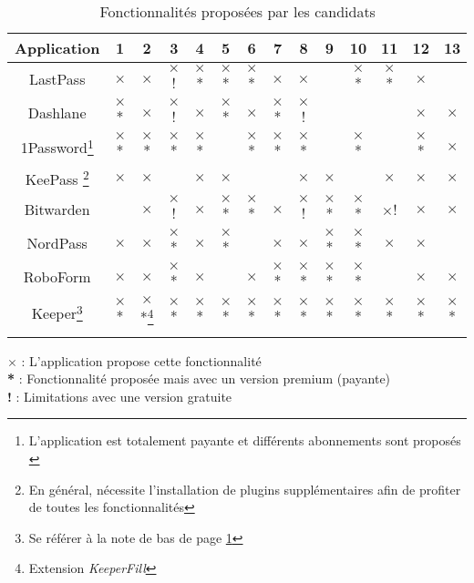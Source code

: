 \begin{longtable}[h]{|c|c|c|c|c|c|c|c|c|c|c|c|c|c|}
	\hline
	Application & 1 & 2 & 3 & 4 & 5 & 6 & 7 & 8 & 9 & 10 & 11 & 12 & 13 \\
	\hline
	LastPass & $\times$ & $\times$ & $\times$! & $\times$* & $\times$* &  $\times$*& $\times$ & $\times$ & & $\times$* & $\times$* & $\times$ & \\
		\hline
	Dashlane & $\times$* & $\times$ & $\times$! & $\times$ & $\times$* & $\times$ & $\times$* & $\times$! & & & & $\times$ & $\times$ \\
		\hline
	1Password\footnote{L'application est totalement payante et différents abonnements sont proposés \label{1p}} & $\times$* & $\times$* & $\times$* & $\times$* & & $\times$* & $\times$* & $\times$* & & $\times$* & & $\times$* & $\times$ \\
			\hline
	KeePass \footnote{En général, nécessite l'installation de plugins supplémentaires afin de profiter de toutes les fonctionnalités} & $\times$ & $\times$ &  & $\times$ & $\times$ & & & $\times$ & $\times$ & & $\times$ & $\times$ & $\times$ \\
		\hline
	Bitwarden &  & $\times$  & $\times$! & $\times$ & $\times$* & $\times$* & $\times$ & $\times$! & $\times$* &  $\times$* & $\times$!& $\times$ & $\times$\\
	\hline
	NordPass & $\times$ & $\times$ & $\times$*  & $\times$ & $\times$* & & $\times$ & $\times$ & $\times$* & $\times$* & $\times$ & $\times$ & \\
	\hline
	RoboForm & $\times$ & $\times$ & $\times$* & $\times$ & & $\times$ & $\times$* & $\times$* & $\times$* & $\times$* & & $\times$ & $\times$ \\
	\hline
	Keeper\footnote{Se référer à la note de bas de page \ref{1p}} & $\times$* & $\times$*\footnote{Extension \textit{KeeperFill}} & $\times$* & $\times$* &$\times$* & $\times$* & $\times$* &$\times$* &$\times$* & $\times$* & $\times$* &  $\times$* & $\times$* \\
	\hline
	\caption{Fonctionnalités proposées par les candidats}
\end{longtable} 
$\times$ : L'application propose cette fonctionnalité \\
\textbf{*}\hspace{0.1cm} : Fonctionnalité proposée mais avec un version premium (payante) \\
\textbf{!}\hspace{0.18cm} : Limitations avec une version gratuite \\

